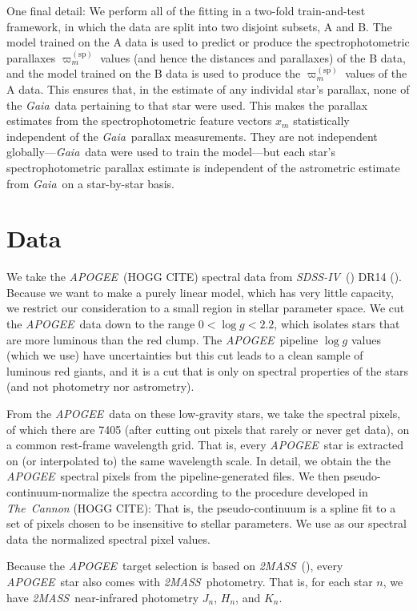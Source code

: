 \documentclass[modern]{aastex62}
\newcommand{\code}[1]{\texttt{\detokenize{#1}}}
\newcommand{\acronym}[1]{{\small{#1}}}
\newcommand{\project}[1]{\textsl{#1}}
\newcommand{\apogee}{\project{\acronym{APOGEE}}}
\newcommand{\gaia}{\project{Gaia}}
\newcommand{\zmass}{\project{\acronym{2MASS}}}
\newcommand{\sdssiv}{\project{\acronym{SDSS-IV}}}
\newcommand{\logg}{\log g}
\newcommand{\sparallax}{\varpi^{(\mathrm{sp})}}
\begin{document}
One final detail: We perform all of the fitting in a two-fold train-and-test framework,
in which the data are split into two disjoint subsets, A and B.
The model trained on the A data is used to predict or produce
the spectrophotometric parallaxes $\sparallax_m$ values (and hence
the distances and parallaxes) of the B data,
and the model trained on the B data is used to 
produce the $\sparallax_m$ values of the A data.
This ensures that, in the estimate of any individal star's
parallax, none of the \gaia\ data pertaining to that star were used.
This makes the parallax estimates from the spectrophotometric feature vectors
$x_m$ statistically independent of the \gaia\ parallax measurements.
They are not independent globally---\gaia\ data were used to train the model---but
each star's spectrophotometric parallax estimate is independent
of the astrometric estimate from \gaia\ on a star-by-star basis.

\section{Data}

We take the \apogee\ (HOGG CITE) spectral data
from \sdssiv\ (\citealt{sdssiv}) \acronym{DR14} (\citealt{dr14}).
Because we want to make a purely linear model, which has very little capacity,
we restrict our consideration to a small region in stellar parameter space.
We cut the \apogee\ data down to the range $0<\logg<2.2$, which isolates
stars that are more luminous than the red clump.
The \apogee\ pipeline $\logg$ values (which we use) have uncertainties but
this cut leads to a clean sample of luminous red giants, and it is a cut
that is only on spectral properties of the stars (and not photometry nor astrometry).

From the \apogee\ data on these low-gravity stars, we take the spectral pixels,
of which there are 7405 (after cutting out pixels that rarely or never get data),
on a common rest-frame wavelength grid.
That is, every \apogee\ star is extracted on (or interpolated to)
the same wavelength scale.
In detail, we obtain the
the \apogee\ spectral pixels from the pipeline-generated \code{aspcapStar} files.
We then pseudo-continuum-normalize the spectra according to the procedure developed
in \project{The~Cannon} (HOGG CITE):
That is, the pseudo-continuum is a spline fit to a set
of pixels chosen to be insensitive to stellar parameters.
We use as our spectral data the normalized spectral pixel values.

Because the \apogee\ target selection is based on \zmass\ (\citealt{zmass}),
every \apogee\ star also comes with \zmass\ photometry.
That is, for each star $n$,
we have \zmass\ near-infrared photometry $J_n$, $H_n$, and $K_n$.
\end{document}
